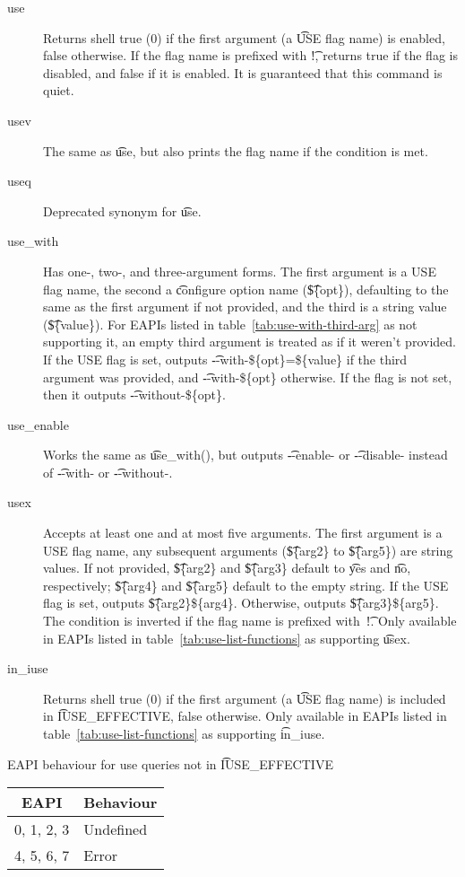 \begin{description}
\item[use] Returns shell true (0) if the first argument (a \t{USE} flag name) is enabled, false
    otherwise.  If the flag name is prefixed with \t{!}, returns true if the flag is disabled, and
    false if it is enabled. It is guaranteed that this command is quiet.
\item[usev] The same as \t{use}, but also prints the flag name if the condition
    is met.
\item[useq] Deprecated synonym for \t{use}.
\item[use_with]  Has one-, two-, and three-argument forms. The first
    argument is a USE flag name, the second a \t{configure} option name (\t{\$\{opt\}}), defaulting
    to the same as the first argument if not provided, and the third is a string value
    (\t{\$\{value\}}). For EAPIs listed in table~\ref{tab:use-with-third-arg} as not supporting it,
    an empty third argument is treated as if it weren't provided. If the USE flag is set, outputs
    \t{-{}-with-\$\{opt\}=\$\{value\}} if the third argument was provided, and
    \t{-{}-with-\$\{opt\}} otherwise. If the flag is not set, then it outputs
    \t{-{}-without-\$\{opt\}}.
\item[use_enable] Works the same as \t{use_with()}, but outputs \t{-{}-enable-} or
    \t{-{}-disable-} instead of \t{-{}-with-} or \t{-{}-without-}.
\item[usex]  Accepts at least one and at most five arguments. The first argument
    is a USE flag name, any subsequent arguments (\t{\$\{arg2\}} to \t{\$\{arg5\}}) are string
    values. If not provided, \t{\$\{arg2\}} and \t{\$\{arg3\}} default to \t{yes} and \t{no},
    respectively; \t{\$\{arg4\}} and \t{\$\{arg5\}} default to the empty string. If the USE flag is
    set, outputs \t{\$\{arg2\}\$\{arg4\}}. Otherwise, outputs \t{\$\{arg3\}\$\{arg5\}}.
    The condition is inverted if the flag name is prefixed with~\t{!}.
    Only available in EAPIs listed in table~\ref{tab:use-list-functions} as supporting \t{usex}.
\item[in_iuse]  Returns shell true (0) if the first argument (a \t{USE} flag
    name) is included in \t{IUSE_EFFECTIVE}, false otherwise. Only available in EAPIs listed in
    table~\ref{tab:use-list-functions} as supporting \t{in_iuse}.
\end{description}

\begin{centertable}{EAPI behaviour for use queries not in \t{IUSE_EFFECTIVE}}
    \label{tab:use-list-strictness}
    \begin{tabular}{ll}
      \toprule
      \multicolumn{1}{c}{\textbf{EAPI}} &
      \multicolumn{1}{c}{\textbf{Behaviour}} \\
      \midrule
      0, 1, 2, 3        & Undefined \\
      4, 5, 6, 7        & Error     \\
      \bottomrule
    \end{tabular}
\end{centertable}

